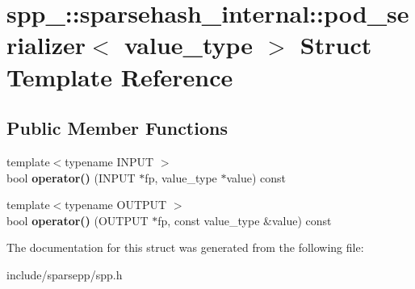 \hypertarget{structspp___1_1sparsehash__internal_1_1pod__serializer}{}\section{spp\+\_\+\+:\+:sparsehash\+\_\+internal\+:\+:pod\+\_\+serializer$<$ value\+\_\+type $>$ Struct Template Reference}
\label{structspp___1_1sparsehash__internal_1_1pod__serializer}
\subsection*{Public Member Functions}
\begin{DoxyCompactItemize}
\item 
{\footnotesize template$<$typename I\+N\+P\+UT $>$ }\\bool {\bfseries operator()} (I\+N\+P\+UT $\ast$fp, value\+\_\+type $\ast$value) const \hypertarget{structspp___1_1sparsehash__internal_1_1pod__serializer_a9f2a158b6ec45980572f96247e26725c}{}\label{structspp___1_1sparsehash__internal_1_1pod__serializer_a9f2a158b6ec45980572f96247e26725c}

\item 
{\footnotesize template$<$typename O\+U\+T\+P\+UT $>$ }\\bool {\bfseries operator()} (O\+U\+T\+P\+UT $\ast$fp, const value\+\_\+type \&value) const \hypertarget{structspp___1_1sparsehash__internal_1_1pod__serializer_ab38d86da92ebd9f4a50adfced10571e8}{}\label{structspp___1_1sparsehash__internal_1_1pod__serializer_ab38d86da92ebd9f4a50adfced10571e8}

\end{DoxyCompactItemize}


The documentation for this struct was generated from the following file\+:\begin{DoxyCompactItemize}
\item 
include/sparsepp/spp.\+h\end{DoxyCompactItemize}
